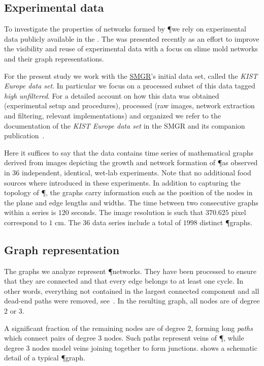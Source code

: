 	\subsection{Experimental data}

		To investigate the properties of networks formed by \P we rely on experimental data publicly available in the \SMGR. The \SMGR was presented recently as an effort to improve the visibility and reuse of experimental data with a focus on slime mold networks and their graph representations.
	
		For the present study we work with the \href{http://smgr.mpi-inf.mpg.de}{SMGR}'s initial data set, called the \emph{KIST Europe data set}. In particular we focus on a processed subset of this data tagged \emph{high unfiltered}. For a detailed account on how this data was obtained (experimental setup and procedures), processed (raw images, network extraction and filtering, relevant implementations) and organized we refer to the documentation of the \emph{KIST Europe data set} in the SMGR and its companion publication~\cite{SMGR}. 

		Here it suffices to say that the data contains time series of mathematical graphs derived from images depicting the growth and network formation of \P as observed in $36$ independent, identical, wet-lab experiments. Note that no additional food sources where introduced in these experiments. In addition to capturing the topology of \P, the graphs carry information such as the position of the nodes in the plane and edge lengths and widths. The time between two consecutive graphs within a series is $120$ seconds. The image resolution is such that $370.625$ pixel correspond to $1$ cm. The $36$ data series include a total of $1998$ distinct \P graphs. 

	\subsection{Graph representation}

		The graphs we analyze represent \P networks. They have been processed to ensure that they are connected and that every edge belongs to at least one cycle. In other words, everything not contained in the largest connected component and all dead-end paths were removed, see~\cite{SMGR}. In the resulting graph, all nodes are of degree $2$ or $3$.

		A significant fraction of the remaining nodes are of degree $2$, forming long \emph{paths} which connect pairs of degree $3$ nodes. Such paths represent veins of \P, while degree $3$ nodes model veins joining together to form junctions.  shows a schematic detail of a typical \P graph.

